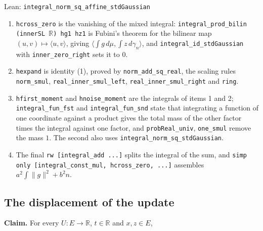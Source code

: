 \documentclass[11pt,a4paper]{report}
\begin{document}
\begin{leanbox}{Lean: \texttt{integral\_\allowbreak{}norm\_\allowbreak{}sq\_\allowbreak{}affine\_\allowbreak{}stdGaussian}}
\begin{enumerate}
\item \texttt{hcross\_\allowbreak{}zero} is the vanishing of the mixed integral: \texttt{integral\_\allowbreak{}prod\_\allowbreak{}bilin (inner\allowbreak{}SL \ensuremath{\mathbb R}) hg1 hz1} is Fubini's theorem for the bilinear map \((u,v)\mapsto\langle u,v\rangle\), giving \(\langle\int g\,d\mu,\int z\,d\gamma_n\rangle\), and \texttt{integral\_\allowbreak{}id\_\allowbreak{}std\allowbreak{}Gaussian} with \texttt{inner\_\allowbreak{}zero\_\allowbreak{}right} sets it to \(0\).

\item \texttt{hexpand} is identity (1), proved by \texttt{norm\_\allowbreak{}add\_\allowbreak{}sq\_\allowbreak{}real}, the scaling rules \texttt{norm\_\allowbreak{}smul}, \texttt{real\_\allowbreak{}inner\_\allowbreak{}smul\_\allowbreak{}left}, \texttt{real\_\allowbreak{}inner\_\allowbreak{}smul\_\allowbreak{}right} and \texttt{ring}.

\item \texttt{hfirst\_\allowbreak{}moment} and \texttt{hnoise\_\allowbreak{}moment} are the integrals of items 1 and 2; \texttt{integral\_\allowbreak{}fun\_\allowbreak{}fst} and \texttt{integral\_\allowbreak{}fun\_\allowbreak{}snd} state that integrating a function of one coordinate against a product gives the total mass of the other factor times the integral against one factor, and \texttt{prob\allowbreak{}Real\_\allowbreak{}univ}, \texttt{one\_\allowbreak{}smul} remove the mass \(1\). The second also uses \texttt{integral\_\allowbreak{}norm\_\allowbreak{}sq\_\allowbreak{}std\allowbreak{}Gaussian}.

\item The final \texttt{rw [integral\_\allowbreak{}add .\allowbreak{}.\allowbreak{}.\allowbreak{}]} splits the integral of the sum, and \texttt{simp only [integral\_\allowbreak{}const\_\allowbreak{}mul, hcross\_\allowbreak{}zero, .\allowbreak{}.\allowbreak{}.\allowbreak{}]} assembles \(a^2\int\|g\|^2+b^2n\).

\end{enumerate}
\end{leanbox}
\subsection{\texorpdfstring{The displacement of the update}{The displacement of the update}}
\label{report-step-UnadjustedLangevin-LSI-GaussianDrift-lean-3}


\textbf{Claim.} For every \(U:E\to\mathbb R\), \(t\in\mathbb R\) and \(x,z\in E\),
\end{document}
